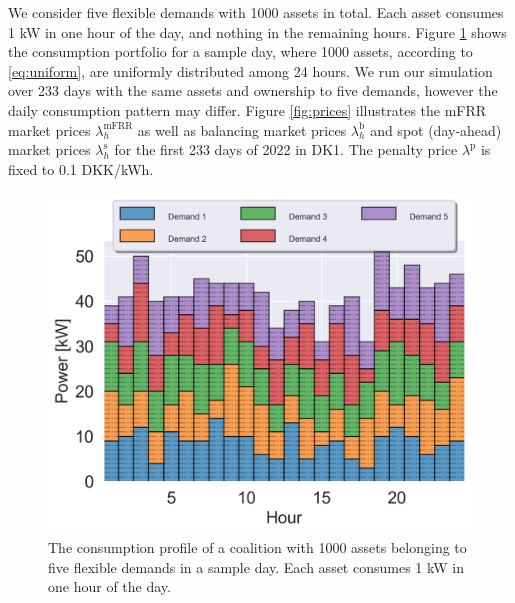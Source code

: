 \documentclass[conference]{IEEEtran}
\begin{document}

We consider five flexible demands with 1000 assets in total. Each asset consumes 1 kW in one hour of the day, and nothing in the remaining hours. Figure \ref{fig:assets} shows the  consumption portfolio for a sample day, where 1000 assets, according to \eqref{eq:uniform}, are uniformly distributed among 24 hours. We run our simulation over 233 days with the same assets and ownership to five demands, however the daily consumption pattern  may differ.  Figure \ref{fig:prices}  illustrates the mFRR market prices $\lambda^{\text{mFRR}}_h$ as well as balancing market prices $\lambda^{\text{b}}_h$ and spot (day-ahead) market prices $\lambda^{\text{s}}_h$ for the first 233 days of 2022 in DK1. The penalty price $\lambda^{\text{p}}$ is fixed to 0.1 DKK/kWh. 


\begin{figure}[!t]
    \centering
    \includegraphics[width=\columnwidth]{figures/assets2.png}
    \caption{The consumption profile of a coalition with 1000 assets belonging to five flexible demands in a sample day. Each asset consumes 1 kW in one hour of the day.}
    \label{fig:assets}
\end{figure}
\end{document}
